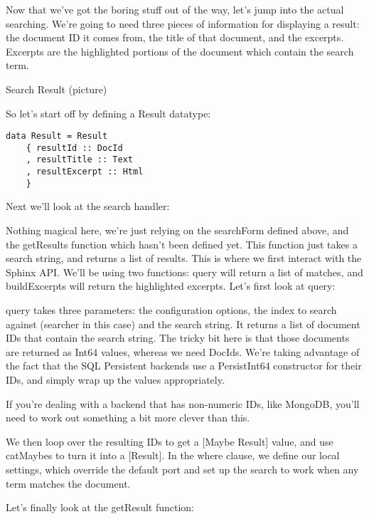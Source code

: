 Now that we've got the boring stuff out of the way, let's jump into the actual searching. We're going to need three pieces of information for displaying a result: the document ID it comes from, the title of that document, and the excerpts. Excerpts are the highlighted portions of the document which contain the search term.

Search Result (picture)

So let's start off by defining a Result datatype:

\begin{lstlisting}
data Result = Result
    { resultId :: DocId
    , resultTitle :: Text
    , resultExcerpt :: Html
    }
\end{lstlisting}

Next we'll look at the search handler:



Nothing magical here, we're just relying on the searchForm defined above, and the getResults function which hasn't been defined yet. This function just takes a search string, and returns a list of results. This is where we first interact with the Sphinx API. We'll be using two functions: query will return a list of matches, and buildExcerpts will return the highlighted excerpts. Let's first look at query:



query takes three parameters: the configuration options, the index to search against (searcher in this case) and the search string. It returns a list of document IDs that contain the search string. The tricky bit here is that those documents are returned as Int64 values, whereas we need DocIds. We're taking advantage of the fact that the SQL Persistent backends use a PersistInt64 constructor for their IDs, and simply wrap up the values appropriately.

If you're dealing with a backend that has non-numeric IDs, like MongoDB, you'll need to work out something a bit more clever than this.

We then loop over the resulting IDs to get a [Maybe Result] value, and use catMaybes to turn it into a [Result]. In the where clause, we define our local settings, which override the default port and set up the search to work when any term matches the document.

Let's finally look at the getResult function:

